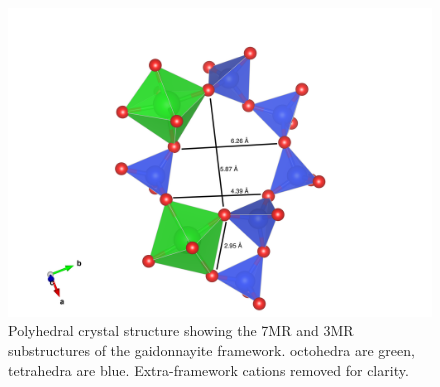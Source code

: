 \documentclass[journal=acsodf,manuscript=article]{achemso}
\begin{document}
\begin{figure}[h!] %
\begin{center}
\includegraphics[width=1.00\columnwidth]{figures/gaidonnayite_7MR_3MR.png}
\caption{{Polyhedral crystal structure showing the 7MR and 3MR substructures of the gaidonnayite framework.   octohedra are green,  tetrahedra are blue. Extra-framework cations removed for clarity.
{\label{fig_gaid_7mr3mr}}%
}}
\end{center}
\end{figure}
\end{document}
